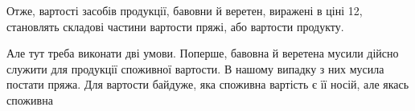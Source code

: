 Отже, вартості засобів продукції, бавовни й веретен, виражені
в ціні 12, становлять складові частини вартости пряжі,
або вартости продукту.

Але тут треба виконати дві умови. Поперше, бавовна й веретена
мусили дійсно служити для продукції споживної вартости.
В нашому випадку з них мусила постати пряжа. Для вартости
байдуже, яка споживна вартість є її носій, але якась споживна
\parbreak{}  %
